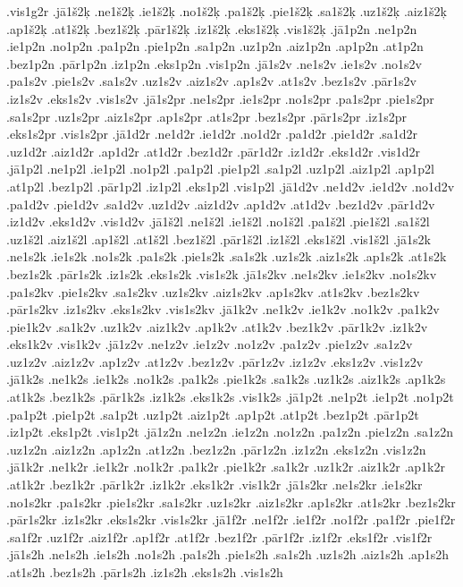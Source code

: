 {.vis1g2r
.jā1š2ķ
.ne1š2ķ
.ie1š2ķ
.no1š2ķ
.pa1š2ķ
.pie1š2ķ
.sa1š2ķ
.uz1š2ķ
.aiz1š2ķ
.ap1š2ķ
.at1š2ķ
.bez1š2ķ
.pār1š2ķ
.iz1š2ķ
.eks1š2ķ
.vis1š2ķ
.jā1p2n
.ne1p2n
.ie1p2n
.no1p2n
.pa1p2n
.pie1p2n
.sa1p2n
.uz1p2n
.aiz1p2n
.ap1p2n
.at1p2n
.bez1p2n
.pār1p2n
.iz1p2n
.eks1p2n
.vis1p2n
.jā1s2v
.ne1s2v
.ie1s2v
.no1s2v
.pa1s2v
.pie1s2v
.sa1s2v
.uz1s2v
.aiz1s2v
.ap1s2v
.at1s2v
.bez1s2v
.pār1s2v
.iz1s2v
.eks1s2v
.vis1s2v
.jā1s2pr
.ne1s2pr
.ie1s2pr
.no1s2pr
.pa1s2pr
.pie1s2pr
.sa1s2pr
.uz1s2pr
.aiz1s2pr
.ap1s2pr
.at1s2pr
.bez1s2pr
.pār1s2pr
.iz1s2pr
.eks1s2pr
.vis1s2pr
.jā1d2r
.ne1d2r
.ie1d2r
.no1d2r
.pa1d2r
.pie1d2r
.sa1d2r
.uz1d2r
.aiz1d2r
.ap1d2r
.at1d2r
.bez1d2r
.pār1d2r
.iz1d2r
.eks1d2r
.vis1d2r
.jā1p2l
.ne1p2l
.ie1p2l
.no1p2l
.pa1p2l
.pie1p2l
.sa1p2l
.uz1p2l
.aiz1p2l
.ap1p2l
.at1p2l
.bez1p2l
.pār1p2l
.iz1p2l
.eks1p2l
.vis1p2l
.jā1d2v
.ne1d2v
.ie1d2v
.no1d2v
.pa1d2v
.pie1d2v
.sa1d2v
.uz1d2v
.aiz1d2v
.ap1d2v
.at1d2v
.bez1d2v
.pār1d2v
.iz1d2v
.eks1d2v
.vis1d2v
.jā1š2l
.ne1š2l
.ie1š2l
.no1š2l
.pa1š2l
.pie1š2l
.sa1š2l
.uz1š2l
.aiz1š2l
.ap1š2l
.at1š2l
.bez1š2l
.pār1š2l
.iz1š2l
.eks1š2l
.vis1š2l
.jā1s2k
.ne1s2k
.ie1s2k
.no1s2k
.pa1s2k
.pie1s2k
.sa1s2k
.uz1s2k
.aiz1s2k
.ap1s2k
.at1s2k
.bez1s2k
.pār1s2k
.iz1s2k
.eks1s2k
.vis1s2k
.jā1s2kv
.ne1s2kv
.ie1s2kv
.no1s2kv
.pa1s2kv
.pie1s2kv
.sa1s2kv
.uz1s2kv
.aiz1s2kv
.ap1s2kv
.at1s2kv
.bez1s2kv
.pār1s2kv
.iz1s2kv
.eks1s2kv
.vis1s2kv
.jā1k2v
.ne1k2v
.ie1k2v
.no1k2v
.pa1k2v
.pie1k2v
.sa1k2v
.uz1k2v
.aiz1k2v
.ap1k2v
.at1k2v
.bez1k2v
.pār1k2v
.iz1k2v
.eks1k2v
.vis1k2v
.jā1z2v
.ne1z2v
.ie1z2v
.no1z2v
.pa1z2v
.pie1z2v
.sa1z2v
.uz1z2v
.aiz1z2v
.ap1z2v
.at1z2v
.bez1z2v
.pār1z2v
.iz1z2v
.eks1z2v
.vis1z2v
.jā1k2s
.ne1k2s
.ie1k2s
.no1k2s
.pa1k2s
.pie1k2s
.sa1k2s
.uz1k2s
.aiz1k2s
.ap1k2s
.at1k2s
.bez1k2s
.pār1k2s
.iz1k2s
.eks1k2s
.vis1k2s
.jā1p2t
.ne1p2t
.ie1p2t
.no1p2t
.pa1p2t
.pie1p2t
.sa1p2t
.uz1p2t
.aiz1p2t
.ap1p2t
.at1p2t
.bez1p2t
.pār1p2t
.iz1p2t
.eks1p2t
.vis1p2t
.jā1z2n
.ne1z2n
.ie1z2n
.no1z2n
.pa1z2n
.pie1z2n
.sa1z2n
.uz1z2n
.aiz1z2n
.ap1z2n
.at1z2n
.bez1z2n
.pār1z2n
.iz1z2n
.eks1z2n
.vis1z2n
.jā1k2r
.ne1k2r
.ie1k2r
.no1k2r
.pa1k2r
.pie1k2r
.sa1k2r
.uz1k2r
.aiz1k2r
.ap1k2r
.at1k2r
.bez1k2r
.pār1k2r
.iz1k2r
.eks1k2r
.vis1k2r
.jā1s2kr
.ne1s2kr
.ie1s2kr
.no1s2kr
.pa1s2kr
.pie1s2kr
.sa1s2kr
.uz1s2kr
.aiz1s2kr
.ap1s2kr
.at1s2kr
.bez1s2kr
.pār1s2kr
.iz1s2kr
.eks1s2kr
.vis1s2kr
.jā1f2r
.ne1f2r
.ie1f2r
.no1f2r
.pa1f2r
.pie1f2r
.sa1f2r
.uz1f2r
.aiz1f2r
.ap1f2r
.at1f2r
.bez1f2r
.pār1f2r
.iz1f2r
.eks1f2r
.vis1f2r
.jā1s2h
.ne1s2h
.ie1s2h
.no1s2h
.pa1s2h
.pie1s2h
.sa1s2h
.uz1s2h
.aiz1s2h
.ap1s2h
.at1s2h
.bez1s2h
.pār1s2h
.iz1s2h
.eks1s2h
.vis1s2h
}
